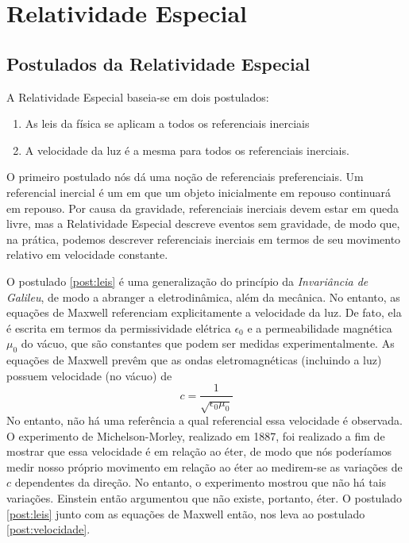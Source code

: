 \chapter{Relatividade Especial}

\section{Postulados da Relatividade Especial}

A Relatividade Especial baseia-se em dois postulados:

\begin{enumerate}[label=\textbf{(\Roman*)}]
    \item As leis da física se aplicam a todos os referenciais inerciais \label{post:leis}
    \item A velocidade da luz é a mesma para todos os referenciais inerciais. \label{post:velocidade}
\end{enumerate}

O primeiro postulado nós dá uma noção de referenciais preferenciais. Um referencial inercial é um em que um objeto inicialmente em repouso continuará em repouso. Por causa da gravidade, referenciais inerciais devem estar em queda livre, mas a Relatividade Especial descreve eventos sem gravidade, de modo que, na prática, podemos descrever referenciais inerciais em termos de seu movimento relativo em velocidade constante.

O postulado \ref{post:leis} é uma generalização do princípio da \textit{Invariância de Galileu}, de modo a abranger a eletrodinâmica, além da mecânica. No entanto, as equações de Maxwell referenciam explicitamente a velocidade da luz. De fato, ela é escrita em termos da permissividade elétrica $\epsilon_0$ e a permeabilidade magnética $\mu_0$ do vácuo, que são constantes que podem ser medidas experimentalmente. As equações de Maxwell prevêm que as ondas eletromagnéticas (incluindo a luz) possuem velocidade (no vácuo) de 
\[
    c = \frac{1}{\sqrt{\epsilon_0\mu_0}}
\]
No entanto, não há uma referência a qual referencial essa velocidade é observada. O experimento de Michelson-Morley, realizado em 1887, foi realizado a fim de mostrar que essa velocidade é em relação ao éter, de modo que nós poderíamos medir nosso próprio movimento em relação ao éter ao medirem-se as variações de $c$ dependentes da direção. No entanto, o experimento mostrou que não há tais variações. Einstein então argumentou que não existe, portanto, éter. O postulado \ref{post:leis} junto com as equações de Maxwell então, nos leva ao postulado \ref{post:velocidade}.

